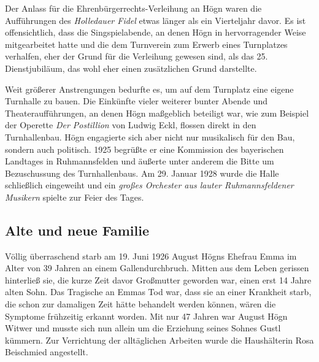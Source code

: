 \documentclass{book}
\newcommand{\zitat}[1]{\textit{#1}}
\begin{document}
Der Anlass für die Ehrenbürgerrechts-Verleihung an Högn waren die
Aufführungen des \textit{Holledauer Fidel} etwas länger als ein
Vierteljahr davor. Es ist offensichtlich, dass die Singspielabende, an
denen Högn in hervorragender Weise mitgearbeitet hatte und die dem
Turnverein zum Erwerb eines Turn\-platzes verhalfen, eher der Grund für
die Verleihung gewesen sind, als das 25. Dienstjubiläum, das wohl eher
einen zusätzlichen Grund darstellte.

 


Weit größerer Anstrengungen bedurfte es, um auf dem Turnplatz eine
eigene Turnhalle zu bauen. Die Einkünfte vieler weiterer bunter Abende
und Theateraufführungen, an denen Högn maßgeblich beteiligt war, wie
zum Beispiel der Operette \textit{Der Postillion} von Ludwig Eckl,
flossen direkt in den Turn\-hallenbau. Högn engagierte sich aber nicht
nur musikalisch für den Bau, son\-dern auch politisch. 1925 begrüßte er
eine Kommission des bayerischen Landtages in Ruhmannsfelden und äußerte
unter anderem die Bitte um Bezu\-schussung des Turnhallenbaus. Am 29.
Januar 1928 wurde die Halle schließ\-lich eingeweiht und ein
\zitat{großes Orchester aus lauter Ruhmannsfeldener Musikern
}spielte zur Feier des Tages.


\subsection{Alte und neue Familie}

Völlig überraschend starb am 19. Juni 1926 August Högns Ehefrau Emma im
Alter von 39 Jahren an einem Gallendurchbruch. Mitten aus dem Leben
geris\-sen hinterließ sie, die kurze Zeit davor Großmutter geworden
war, einen erst 14 Jahre alten Sohn. Das Tragische an Emmas Tod war,
dass sie an einer Krankheit starb, die schon zur damaligen Zeit hätte
behandelt werden können, wären die Symptome frühzeitig erkannt worden.
Mit nur 47 Jahren war August Högn Witwer und musste sich nun allein um
die Erziehung seines Sohnes Gustl kümmern. Zur Verrichtung der
alltäglichen Arbeiten wurde die Haushälterin Rosa Beischmied
angestellt.
\end{document}
